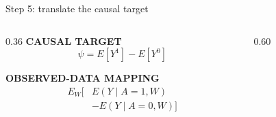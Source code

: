 \documentclass[aspectratio=169]{beamer}
\begin{document}
\begin{frame}{Step 5: translate the causal target}
  \begin{columns}[T,onlytextwidth]
    \begin{column}{0.36\textwidth}
      {\footnotesize\bfseries\color{navorange}CAUSAL TARGET}
      \[
        \psi = E[Y^{1}] - E[Y^{0}]
      \]

      {\footnotesize\bfseries\color{navorange}OBSERVED-DATA MAPPING}
      {\scriptsize
      \[
        \begin{aligned}
        E_W\big[&E(Y\mid A=1,W)\\
                &-E(Y\mid A=0,W)\big]
        \end{aligned}
      \]}

      {\scriptsize
        }
    \end{column}
    \begin{column}{0.60\textwidth}
      \centering
    \end{column}
  \end{columns}
\end{frame}
\end{document}
